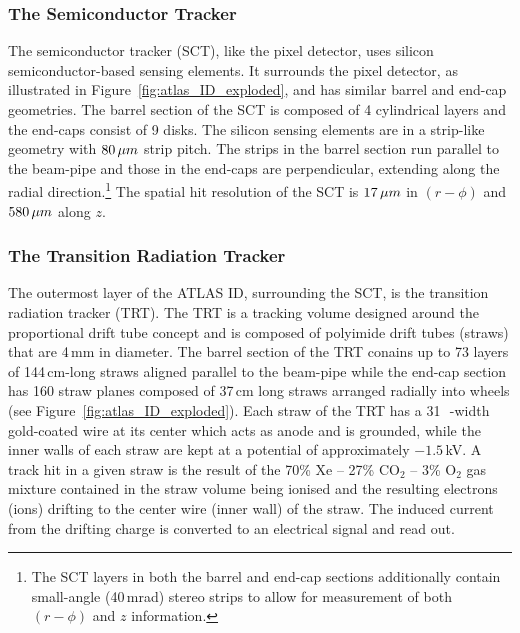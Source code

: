 \subsubsection{The Semiconductor Tracker}
\label{sec:id_sct}

The semiconductor tracker (SCT), like the pixel detector, uses silicon semiconductor-based sensing
elements.
It surrounds the pixel detector, as illustrated in Figure~\ref{fig:atlas_ID_exploded},
and has similar barrel and end-cap geometries.
The barrel section of the SCT is composed of 4 cylindrical layers and the end-caps consist
of 9 disks.
The silicon sensing elements are in a strip-like geometry with
$80\,\mu m$ strip pitch.
The strips in the barrel section run parallel to the beam-pipe and those in the
end-caps are perpendicular, extending along the radial direction.\footnote{
The SCT layers in both the barrel and end-cap sections additionally contain small-angle (40\,mrad) stereo strips to allow for measurement of both
$(r-\phi)$ and $z$ information.}
The spatial hit resolution of the SCT is $17\,\mu m$ in $(r-\phi)$ and $580\,\mu m$
along $z$.

\subsubsection{The Transition Radiation Tracker}
\label{sec:trt}

The outermost layer of the ATLAS ID, surrounding the SCT, is the transition
radiation tracker (TRT).
The TRT is a tracking volume designed around the proportional drift tube concept
and is composed of polyimide drift tubes (straws) that are 4\,mm in diameter.
The barrel section of the TRT conains up to 73 layers of 144\,cm-long straws aligned parallel to the
beam-pipe while the end-cap section has 160 straw planes composed of 37\,cm long straws arranged radially
into wheels (see Figure~\ref{fig:atlas_ID_exploded}).
Each straw of the TRT has a 31\,\micron~-width gold-coated wire at its center which acts as anode
and is grounded, while the inner walls of each straw are kept at a potential of
approximately $-1.5$\,kV.
A track hit in a given straw is the result of the 70\% Xe -- 27\% CO$_2$ -- 3\% O$_2$ gas mixture contained
in the straw volume being ionised and the resulting electrons (ions) drifting to
the center wire (inner wall) of the straw. The induced current from the drifting
charge is converted to an electrical signal and read out.


